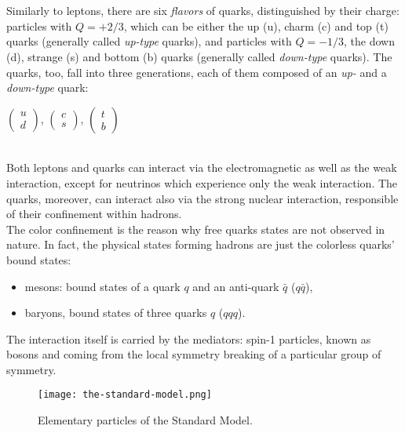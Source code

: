 \hspace{0.4cm}
\\\\
Similarly to leptons, there are six \emph{flavors} of quarks, distinguished by their charge: particles with $Q = +2/3$, which can be either the up (u), charm (c) and top (t) quarks (generally called \emph{up-type} quarks), and particles with $Q = -1/3$, the down (d), strange (s) and bottom (b) quarks (generally called \emph{down-type} quarks).
The quarks, too, fall into three generations, each of them composed of an \emph{up-} and a \emph{down-type} quark:
\\
\begin{center}
$\begin{pmatrix}
u \\ d
\end{pmatrix}$,\hspace{0.2cm}  
$\begin{pmatrix}
c \\ s
\end{pmatrix}$,\hspace{0.2cm}
$\begin{pmatrix}
t \\ b
\end{pmatrix}$
\end{center}
\hspace{0.4cm}
\\
Both leptons and quarks can interact via the electromagnetic as well as the weak interaction, except for neutrinos which experience only the weak interaction. The quarks, moreover, can interact also via the strong nuclear interaction, responsible of their confinement within hadrons.
\\
The color confinement is the reason why free quarks states are not observed in nature. In fact, the physical states forming hadrons are just the colorless quarks' bound states: \begin{itemize}
\item mesons: bound states of a quark $q$ and an anti-quark $\bar{q}$ ($q\bar{q}$),
\item baryons, bound states of three quarks $q$ ($qqq$).
\end{itemize}
The interaction itself is carried by the mediators: spin-1 particles, known as bosons and coming from the local symmetry breaking of a particular group of symmetry.
\begin{figure}[tb]
\centering
\texttt{[image: the-standard-model.png]}
\caption{Elementary particles of the Standard Model.}
\end{figure}
